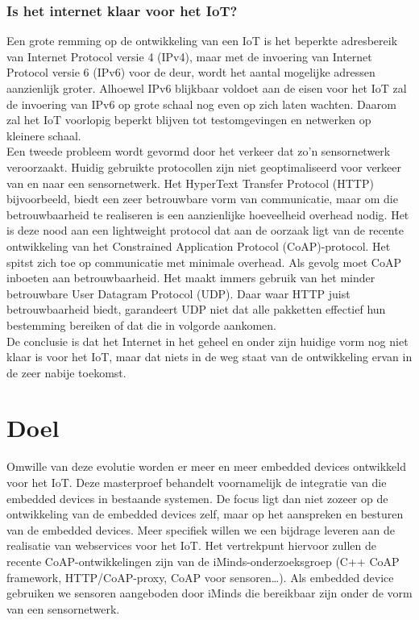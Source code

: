 \subsubsection{Is het internet klaar voor het IoT?}
Een grote remming op de ontwikkeling van een IoT is het beperkte adresbereik van Internet Protocol versie 4 (IPv4), maar met de invoering van Internet Protocol versie 6 (IPv6) voor de deur, wordt het aantal mogelijke adressen aanzienlijk groter.
Alhoewel IPv6 blijkbaar voldoet aan de eisen voor het IoT zal de invoering van IPv6 op grote schaal nog even op zich laten wachten. Daarom zal het IoT voorlopig beperkt blijven tot testomgevingen en netwerken op kleinere schaal.\\
Een tweede probleem wordt gevormd door het verkeer dat zo'n sensornetwerk veroorzaakt. Huidig gebruikte protocollen zijn niet geoptimaliseerd voor verkeer van en naar een sensornetwerk. Het HyperText Transfer Protocol (HTTP) bijvoorbeeld, biedt een zeer betrouwbare vorm van communicatie, maar om die betrouwbaarheid te realiseren is een aanzienlijke hoeveelheid overhead nodig. Het is deze nood aan een lightweight protocol dat aan de oorzaak ligt van de recente ontwikkeling van het Constrained Application Protocol (CoAP)-protocol. Het spitst zich toe op communicatie met minimale overhead. Als gevolg moet CoAP inboeten aan betrouwbaarheid. Het maakt immers gebruik van het minder betrouwbare User Datagram Protocol (UDP). Daar waar HTTP juist betrouwbaarheid biedt, garandeert UDP niet dat alle pakketten effectief hun bestemming bereiken of dat die in volgorde aankomen.\\
De conclusie is dat het Internet in het geheel en onder zijn huidige vorm nog niet klaar is voor het IoT, maar dat niets in de weg staat van de ontwikkeling ervan in de zeer nabije toekomst.

\section{Doel}

Omwille van deze evolutie worden er meer en meer embedded devices ontwikkeld voor het IoT. Deze masterproef behandelt voornamelijk de integratie van die embedded devices in bestaande systemen. De focus ligt dan niet zozeer op de ontwikkeling van de embedded devices zelf, maar op het aanspreken en besturen van de embedded devices. Meer specifiek willen we een bijdrage leveren aan de realisatie van webservices voor het IoT. Het vertrekpunt hiervoor zullen de recente CoAP-ontwikkelingen zijn van de iMinds-onderzoeksgroep (C++ CoAP framework, HTTP/CoAP-proxy, CoAP voor sensoren…). Als embedded device gebruiken we sensoren aangeboden door iMinds die bereikbaar zijn onder de vorm van een sensornetwerk.\\

